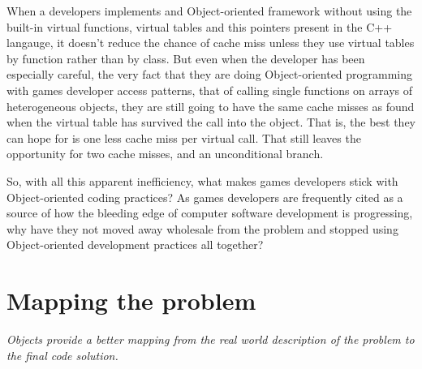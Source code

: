 When a developers implements and Object-oriented framework without using the
built-in virtual functions, virtual tables and this pointers present in the C++
langauge, it doesn't reduce the chance of cache miss unless they use virtual
tables by function rather than by class. But even when the developer has been
especially careful, the very fact that they are doing Object-oriented
programming with games developer access patterns, that of calling single
functions on arrays of heterogeneous objects, they are still going to have the
same cache misses as found when the virtual table has survived the call into
the object. That is, the best they can hope for is one less cache miss per
virtual call. That still leaves the opportunity for two cache misses, and an
unconditional branch.

So, with all this apparent inefficiency, what makes games developers stick with
Object-oriented coding practices? As games developers are frequently cited as a
source of how the bleeding edge of computer software development is
progressing, why have they not moved away wholesale from the problem and
stopped using Object-oriented development practices all together?

\section{Mapping the problem}
\emph{Objects provide a better mapping from the real
world description of the problem to the final code solution.} \\ \hfill


